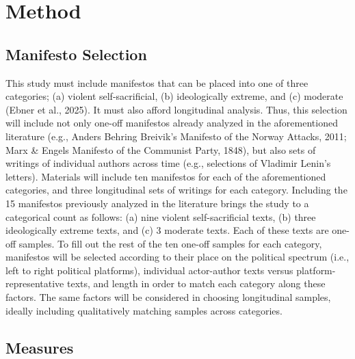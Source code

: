\documentclass[
  english,
  man]{apa6}
\begin{document}
\section{Method}\label{method}

\subsection{Manifesto Selection}\label{manifesto-selection}

This study must include manifestos that can be placed into one of three categories; (a) violent self-sacrificial, (b) ideologically extreme, and (c) moderate (Ebner et al., 2025). It must also afford longitudinal analysis. Thus, this selection will include not only one-off manifestos already analyzed in the aforementioned literature (e.g., Anders Behring Breivik's Manifesto of the Norway Attacks, 2011; Marx \& Engels Manifesto of the Communist Party, 1848), but also sets of writings of individual authors across time (e.g., selections of Vladimir Lenin's letters). Materials will include ten manifestos for each of the aforementioned categories, and three longitudinal sets of writings for each category. Including the 15 manifestos previously analyzed in the literature brings the study to a categorical count as follows: (a) nine violent self-sacrificial texts, (b) three ideologically extreme texts, and (c) 3 moderate texts. Each of these texts are one-off samples. To fill out the rest of the ten one-off samples for each category, manifestos will be selected according to their place on the political spectrum (i.e., left to right political platforms), individual actor-author texts versus platform-representative texts, and length in order to match each category along these factors. The same factors will be considered in choosing longitudinal samples, ideally including qualitatively matching samples across categories.

\subsection{Measures}\label{measures}
\end{document}
